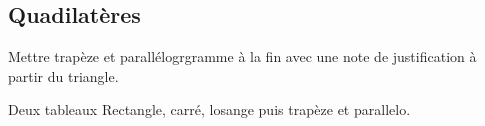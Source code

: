 
\subsection{Quadilat\`{e}res}
Mettre trapèze et parallélogrgramme à la fin avec une note de justification à partir du triangle.

Deux tableaux Rectangle, carré, losange puis trapèze et parallelo.

